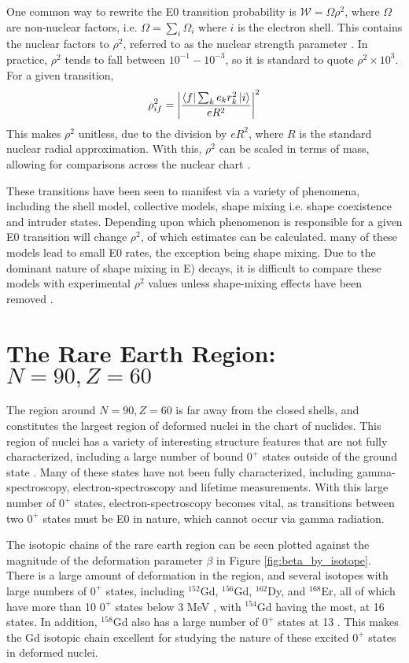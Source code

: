 One common way to rewrite the E0 transition probability is 
$\mathcal{W}=\Omega\rho^2$, where $\Omega$ are non-nuclear factors, i.e. $\Omega=\sum_i\Omega_i$ where $i$ is the electron shell. This contains the nuclear factors to $\rho^2$, referred to as the nuclear strength parameter \citep{church56:_monopole,wood99:_e0}. In practice, $\rho^2$ tends to fall between $10^{-1}-10^{-3}$, so it is standard to quote $\rho^2\times10^3$. For a given transition, \begin{equation}
    \rho^2_{if}=\abs{\frac{\bra{f}\sum_ke_kr_k^2\ket{i}}{eR^2}}^2
\end{equation}
This makes $\rho^2$ unitless, due to the division by $eR^2$, where $R$ is the standard nuclear radial approximation. With this, $\rho^2$ can be scaled in terms of mass, allowing for comparisons across the nuclear chart \citep{wood99:_e0}.

These transitions have been seen to manifest via a variety of phenomena, including the shell model, collective models, shape mixing i.e. shape coexistence and intruder states\citep{wood99:_e0}. Depending upon which phenomenon is responsible for a given E0 transition will change $\rho^2$, of which estimates can be calculated. many of these models lead to small E0 rates, the exception being shape mixing. Due to the dominant nature of shape mixing in E) decays, it is difficult to compare these models with experimental $\rho^2$ values unless shape-mixing effects have been removed \citep{wood99:_e0}.

\section{The Rare Earth Region: $N=90,Z=60$}

The region around $N=90,Z=60$ is far away from the closed shells, and constitutes the largest region of deformed nuclei in the chart of nuclides. This region of nuclei has a variety of interesting structure features that are not fully characterized, including a large number of bound $0^+$ states outside of the ground state \citep{meyer06:_zeroplus}. Many of these states have not been fully characterized, including gamma-spectroscopy, electron-spectroscopy and lifetime measurements. With this large number of $0^+$ states, electron-spectroscopy becomes vital, as transitions between two $0^+$ states must be E0 in nature, which cannot occur via gamma radiation.

The isotopic chains of the rare earth region can be seen plotted against the magnitude of the deformation parameter $\beta$ in Figure \ref{fig:beta_by_isotope}. There is a large amount of deformation in the region, and several isotopes with large numbers of $0^+$ states, including $^{152}$Gd, $^{156}$Gd, $^{162}$Dy, and $^{168}$Er, all of which have more than 10 $0^+$ states below 3 MeV \citep{meyer06:_zeroplus}, with $^{154}$Gd having the most, at 16 states. In addition, $^{158}$Gd also has a large number of $0^+$ states at 13 \citep{lesher02:_158gd}. This makes the Gd isotopic chain excellent for studying the nature of these excited $0^+$ states in deformed nuclei.


